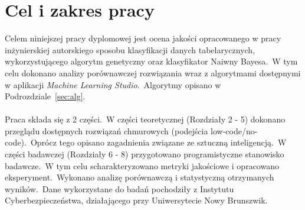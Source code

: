 \section{Cel i zakres pracy}
Celem niniejszej pracy dyplomowej jest ocena jakości opracowanego w pracy inżynierskiej autorskiego sposobu klasyfikacji danych tabelarycznych, wykorzystującego algorytm genetyczny oraz klasyfikator Naiwny Bayesa.\ W tym celu dokonano analizy porównawczej rozwiązania wraz z algorytmami dostępnymi w aplikacji \textit{Machine Learning Studio}.\ Algorytmy opisano w Podrozdziale~\ref{sec:alg}.
\\ \\
Praca składa się z 2 części.\ W części teoretycznej (Rozdziały 2 - 5) dokonano przeglądu dostępnych rozwiązań chmurowych (podejścia low-code/no-code).\ Oprócz tego opisano zagadnienia związane ze sztuczną inteligencją.\ W części badawczej (Rozdziały 6 - 8) przygotowano programistyczne stanowisko badawcze.\ W tym celu scharakteryzowano metryki jakościowe i opracowano eksperyment.\ Wykonano analizę porównawczą i statystyczną otrzymanych wyników.\ Dane wykorzystane do badań pochodziły z Instytutu Cyberbezpieczeństwa, działającego przy Uniwersytecie Nowy Brunszwik.

